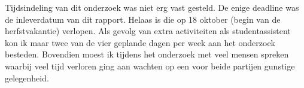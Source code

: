 
Tijdsindeling van dit onderzoek was niet erg vast gesteld. De enige
deadline was de inleverdatum van dit rapport. Helaas is die op 18
oktober (begin van de herfstvakantie) verlopen. Als gevolg van extra
activiteiten als studentassistent kon ik maar twee van de vier
geplande dagen per week aan het onderzoek besteden. Bovendien moest ik
tijdens het onderzoek met veel mensen spreken waarbij veel tijd
verloren ging aan wachten op een voor beide partijen gunstige
gelegenheid.
